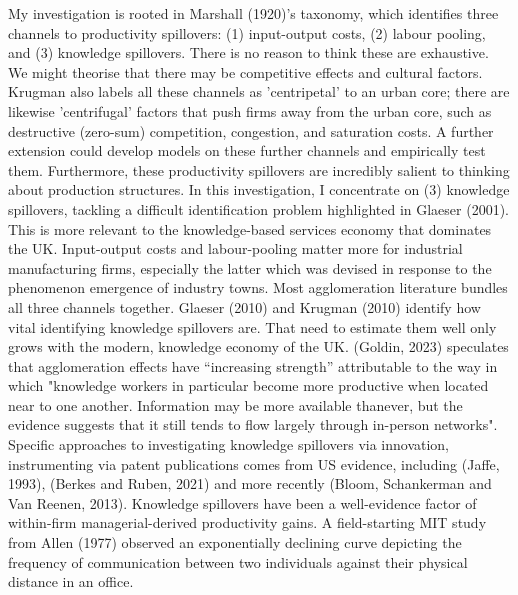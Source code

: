 My investigation is rooted in Marshall (1920)'s taxonomy, which identifies three channels to productivity spillovers: (1) input-output costs,
(2) labour pooling, and (3) knowledge spillovers.
There is no reason to think these are exhaustive. We might theorise that there may be competitive effects and cultural factors.
Krugman also labels all these channels as 'centripetal' to an urban core; there are likewise 'centrifugal' factors that
push firms away from the urban core, such as destructive (zero-sum) competition, congestion, and saturation costs.
A further extension could develop models on these further channels and empirically test them.
Furthermore, these productivity spillovers are incredibly salient to thinking about production structures.
\newline
In this investigation, I concentrate on (3) knowledge spillovers, tackling a difficult identification problem highlighted in Glaeser (2001).
This is more relevant to the knowledge-based services economy that dominates the UK.
Input-output costs and labour-pooling matter more for industrial manufacturing firms, especially the latter which was devised in response to
the phenomenon emergence of industry towns.
\newline
Most agglomeration literature bundles all three channels together. Glaeser (2010) and Krugman (2010) identify how vital
identifying knowledge spillovers are. That need to estimate them well only grows with the modern, knowledge economy of the UK.
(Goldin, 2023) speculates that agglomeration effects have “increasing strength” attributable to the way in which
"knowledge workers in particular become more productive when located near to one another.
Information may be more available thanever, but the evidence suggests that it still tends to flow largely through in-person networks".
\newline
Specific approaches to investigating knowledge spillovers via innovation, instrumenting via patent publications comes from US evidence,
including (Jaffe, 1993), (Berkes and Ruben, 2021) and more recently (Bloom, Schankerman and Van Reenen, 2013).
\newline
Knowledge spillovers have been a well-evidence factor of within-firm managerial-derived productivity gains. A field-starting MIT study from Allen (1977) observed an exponentially declining curve depicting the frequency of communication between two individuals against their physical distance in an office.